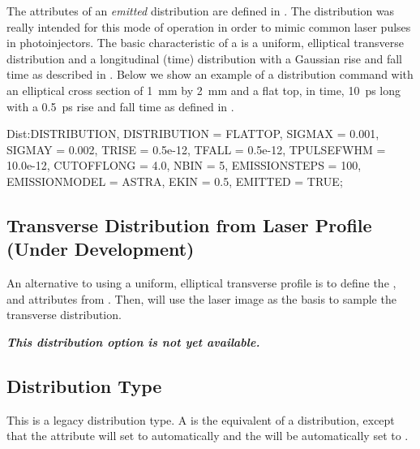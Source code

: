 The attributes of an \emph{emitted}  distribution are defined in .
The  distribution was really intended for this mode of operation in order to mimic
common laser pulses in photoinjectors. The basic characteristic of a  is a uniform, elliptical transverse distribution
and a longitudinal (time) distribution with a Gaussian rise and fall time as described in .
Below we show an example of a  distribution command with an elliptical cross section of \SI{1}{\milli\meter} by \SI{2}{\milli\meter} and a flat top,
in time, \SI{10}{\pico\second} long with a \SI{0.5}{\pico\second} rise and fall time as defined in .

\begin{example}
Dist:DISTRIBUTION, DISTRIBUTION = FLATTOP,
                   SIGMAX = 0.001,
                   SIGMAY = 0.002,
                   TRISE = 0.5e-12,
                   TFALL = 0.5e-12,
                   TPULSEFWHM = 10.0e-12,
                   CUTOFFLONG = 4.0,
                   NBIN = 5,
                   EMISSIONSTEPS = 100,
                   EMISSIONMODEL = ASTRA,
                   EKIN = 0.5,
                   EMITTED = TRUE;
\end{example}

\subsection{Transverse Distribution from Laser Profile (Under Development)}
An alternative to using a uniform, elliptical transverse profile is to define the ,  and
 attributes from . Then, \opalt will use the laser image as the basis
to sample the transverse distribution.

\textbf{\emph{This distribution option is not yet available.}}


\subsection{ Distribution Type}
\label{sec:gungaussflattopthdisttype}
This is a legacy distribution type. A  is the equivalent of a  distribution, except that
the  attribute will set to  automatically and the  will be automatically set
to .

